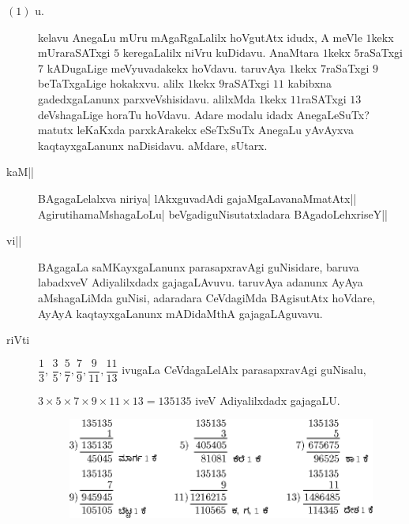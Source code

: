 

\begin{description}
\item[$(1)$ u.] kelavu AnegaLu mUru mAgaRgaLalilx hoVgutAtx idudx, A
  meVle $1$kekx mUraraSATxgi $5$ keregaLalilx niVru kuDidavu. AnaMtara
  $1$kekx $5$raSaTxgi $7$ kADugaLige meVyuvadakekx hoVdavu. taruvAya
  $1$kekx $7$raSaTxgi $9$ beTaTxgaLige hokakxvu. alilx $1$kekx
  $9$raSATxgi $11$ kabibxna gadedxgaLanunx parxveVshisidavu. alilxMda
  $1$kekx $11$raSATxgi $13$ deVshagaLige horaTu hoVdavu. Adare modalu
  idadx AnegaLeSuTx? matutx leKaKxda parxkArakekx eSeTxSuTx AnegaLu
  yAvAyxva kaqtayxgaLanunx naDisidavu. aMdare, sUtarx.

\item[kaM||] BAgagaLelalxva niriya| lAkxguvadAdi
  gajaMgaLavanaMmatAtx|| AgirutihamaMshagaLoLu|
  beVgadiguNisutatxladara BAgadoLehxriseY||

\item[vi||] BAgagaLa saMKayxgaLanunx parasapxravAgi guNisidare, baruva
  labadxveV Adiyalilxdadx gajagaLAvuvu. taruvAya adanunx AyAya
  aMshagaLiMda guNisi, adaradara CeVdagiMda BAgisutAtx hoVdare, AyAyA
  kaqtayxgaLanunx mADidaMthA gajagaLAguvavu.

\item[riVti] $\dfrac{1}{3}$, $\dfrac{3}{5}, \dfrac{5}{7}, \dfrac{7}{9},
  \dfrac{9}{11}, \dfrac{11}{13}$ ivugaLa CeVdagaLelAlx parasapxravAgi
  guNisalu, 

  $3 \times 5 \times 7 \times 9 \times 11 \times 13= 135135$
  iveV Adiyalilxdadx gajagaLU.
 \begin{figure}[H]
  \centerline{ \includegraphics{images/177.eps}}
 \end{figure}

\end{description}
